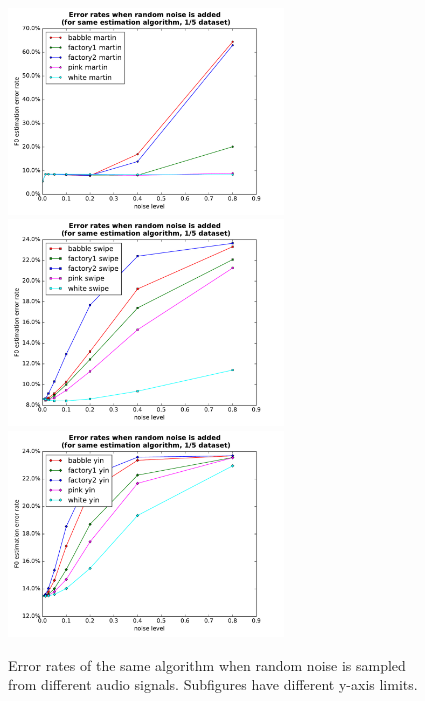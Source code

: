\documentclass[11pt,a4paper]{report}
\begin{document}
\begin{figure}[htbp]
  \centering
  \includegraphics[width=0.65\textwidth]{error_rates_random_noise_martin.pdf}
  \includegraphics[width=0.65\textwidth]{error_rates_random_noise_swipe.pdf}
  \includegraphics[width=0.65\textwidth]{error_rates_random_noise_yin.pdf}
  \caption[Error rates of the same algorithm when random noise is sampled from different audios.]{Error rates of the same algorithm when random noise is sampled from different audio signals.
    Subfigures have different y-axis limits.}
  \label{fig:random-noise-same-algorithm}
\end{figure}
\end{document}
